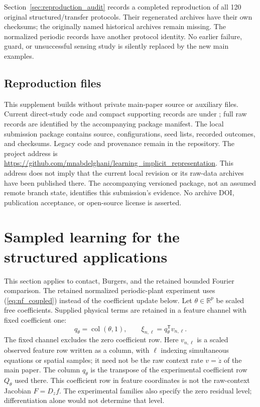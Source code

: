 \documentclass[journal]{IEEEtran}
\newcommand{\col}{\operatorname{col}}
\begin{document}
Section~\ref{sec:reproduction_audit} records a completed reproduction of
all 120 original structured/transfer protocols. Their regenerated archives
have their own checksums; the originally named historical archives remain
missing. The normalized periodic records have another protocol identity.
No earlier failure, guard, or unsuccessful sensing study is silently replaced
by the new main examples.

\subsection*{Reproduction files}
This supplement builds without private main-paper source or auxiliary files.
Current direct-study code and compact supporting records are under
; full raw records are identified by
the accompanying package manifest. The local submission package contains
source, configurations, seed lists, recorded outcomes, and checksums.
Legacy code and provenance remain in the repository. The project address is
\url{https://github.com/mnabdelghani/learning_implicit_representation}.
This address does not imply that the current local revision or its raw-data
archives have been published there. The accompanying versioned package,
not an assumed remote branch state, identifies this submission's evidence.
No archive DOI, publication acceptance, or open-source license is asserted.

\section{Sampled learning for the structured applications}
\label{sec:numerics}
This section applies to contact, Burgers, and the retained bounded Fourier
comparison. The retained normalized periodic-plant experiment uses
(\ref{eq:nf_coupled}) instead of the coefficient update below.
Let $\theta\in\mathbb R^p$ be scaled free coefficients. Supplied physical
terms are retained in a feature channel with fixed coefficient one:
\begin{equation}
 q_\theta=\col(\theta,1),\qquad \xi_{n,\ell}=q_\theta^{\mathsf T}v_{n,\ell}.
 \label{eq:sampled_implicit_relation}
\end{equation}
The fixed channel excludes the zero coefficient row. Here $v_{n,\ell}$ is a scaled observed feature row written as a column,
with $\ell$ indexing simultaneous equations or spatial samples; it need not
be the raw context rate $v=\dot z$ of the main paper. The column $q_\theta$
is the transpose of the experimental coefficient row $Q_\theta$ used there.
This coefficient row in feature coordinates is not the raw-context Jacobian
$F=D_zf$. The
experimental families also specify the zero residual level; differentiation
alone would not determine that level.
\end{document}
